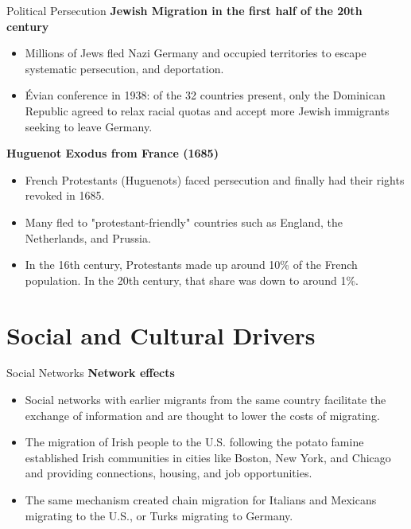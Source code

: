 \documentclass{beamer}
\begin{document}
\begin{frame}{Political Persecution}
    \textbf{Jewish Migration in the first half of the 20th century}
    \begin{itemize} \small
        \item Millions of Jews fled Nazi Germany and occupied territories to escape systematic persecution, and deportation.
        \item Évian conference in 1938: of the 32 countries present, only the Dominican Republic agreed to relax racial quotas and accept more Jewish immigrants seeking to leave Germany.
    \end{itemize}
    \textbf{Huguenot Exodus from France (1685)}
    \begin{itemize} \small
        \item French Protestants (Huguenots) faced persecution and finally had their rights revoked in 1685. 
        \item Many fled to "protestant-friendly" countries such as England, the Netherlands, and Prussia.
        \item In the 16th century, Protestants made up around 10\% of the French population. In the 20th century, that share was down to around 1\%. 
    \end{itemize}
\end{frame}

\section{Social and Cultural Drivers}

\begin{frame}{Social Networks}
\textbf{Network effects}
    \begin{itemize} \small
        \item Social networks with earlier migrants from the same country facilitate the exchange of information and are thought to lower the costs of migrating.
        \item The migration of Irish people to the U.S. following the potato famine established Irish communities in cities like Boston, New York, and Chicago and providing connections, housing, and job opportunities.
        \item The same mechanism created chain migration for Italians and Mexicans migrating to the U.S., or Turks migrating to Germany.
    \end{itemize}
\end{frame}
\end{document}
